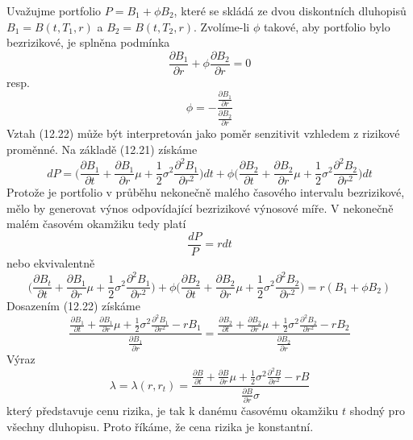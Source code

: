 \documentclass[a4paper]{book}
\begin{document}
Uvažujme portfolio $P = B_1 + \phi B_2$, které se skládá ze dvou diskontních dluhopisů $B_1 = B(t, T_1,r)$ a $B_2 = B(t, T_2, r)$. Zvolíme-li $\phi$ takové, aby portfolio bylo bezrizikové, je splněna podmínka
\begin{equation*}
\frac{\partial B_1}{\partial r} + \phi \frac{\partial B_2}{\partial r} = 0
\end{equation*}
resp.
\begin{equation}
\phi = - \frac{\frac{\partial B_1}{\partial r}}{\frac{\partial B_2}{\partial r}}
\end{equation}
Vztah (12.22) může být interpretován jako poměr senzitivit vzhledem z rizikové proměnné. Na základě (12.21) získáme
\begin{equation*}
dP = \Big( \frac{\partial B_1}{\partial t} + \frac{\partial B_1}{\partial r}\mu + \frac{1}{2}\sigma^2 \frac{\partial^2 B_1}{\partial r^2}\Big)dt + \phi \Big( \frac{\partial B_2}{\partial t} + \frac{\partial B_2}{\partial r}\mu + \frac{1}{2}\sigma^2 \frac{\partial^2 B_2}{\partial r^2} \Big)dt
\end{equation*}
Protože je portfolio v průběhu nekonečně malého časového intervalu bezrizikové, mělo by generovat výnos odpovídající bezrizikové výnosové míře. V nekonečně malém časovém okamžiku tedy platí
\begin{equation*}
\frac{dP}{P} = r dt
\end{equation*}
nebo ekvivalentně
\begin{equation*}
\Big( \frac{\partial B_t}{\partial t} + \frac{\partial B_1}{\partial r}\mu + \frac{1}{2} \sigma^2 \frac{\partial^2 B_1}{\partial r^2} \Big) + \phi \Big( \frac{\partial B_2}{\partial t} + \frac{\partial B_2}{\partial r}\mu + \frac{1}{2}\sigma^2 \frac{\partial^2 B_2}{\partial r^2} \Big) = r(B_1 + \phi B_2)
\end{equation*}
Dosazením (12.22) získáme
\begin{equation*}
\frac{\frac{\partial B_1}{\partial t} + \frac{\partial B_1}{\partial r}\mu + \frac{1}{2}\sigma^2 \frac{\partial^2 B_1}{\partial r^2} - rB_1}{\frac{\partial B_1}{\partial r}} = \frac{\frac{\partial B_2}{\partial t} + \frac{\partial B_2}{\partial r}\mu + \frac{1}{2}\sigma^2 \frac{\partial^2 B_2}{\partial r^2} - rB_2}{\frac{\partial B_2}{\partial r}}
\end{equation*}
Výraz
\begin{equation}
\lambda = \lambda(r, r_t) = \frac{\frac{\partial B}{\partial t} + \frac{\partial B}{\partial r}\mu + \frac{1}{2}\sigma^2 \frac{\partial^2 B}{\partial r^2} - rB}{\frac{\partial B}{\partial r}\sigma}
\end{equation}
který představuje cenu rizika, je tak k danému časovému okamžiku $t$ shodný pro všechny dluhopisu. Proto říkáme, že cena rizika je konstantní.
\end{document}
